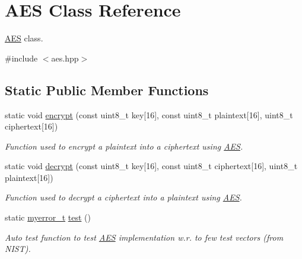 \hypertarget{classAES}{}\section{A\+E\+S Class Reference}
\label{classAES}


\hyperlink{classAES}{A\+E\+S} class.  




{\ttfamily \#include $<$aes.\+hpp$>$}

\subsection*{Static Public Member Functions}
\begin{DoxyCompactItemize}
\item 
static void \hyperlink{classAES_adb46cb1dbb14ff70f072d67913f65f38}{encrypt} (const uint8\+\_\+t key\mbox{[}16\mbox{]}, const uint8\+\_\+t plaintext\mbox{[}16\mbox{]}, uint8\+\_\+t ciphertext\mbox{[}16\mbox{]})
\begin{DoxyCompactList}\small\item\em Function used to encrypt a plaintext into a ciphertext using \hyperlink{classAES}{A\+E\+S}. \end{DoxyCompactList}\item 
static void \hyperlink{classAES_a81b2fbb6ef1422b54e4ca552a2cc36e4}{decrypt} (const uint8\+\_\+t key\mbox{[}16\mbox{]}, const uint8\+\_\+t ciphertext\mbox{[}16\mbox{]}, uint8\+\_\+t plaintext\mbox{[}16\mbox{]})
\begin{DoxyCompactList}\small\item\em Function used to decrypt a ciphertext into a plaintext using \hyperlink{classAES}{A\+E\+S}. \end{DoxyCompactList}\item 
static \hyperlink{error_8hpp_acabd2917084445509becf54ab64a4bd0}{myerror\+\_\+t} \hyperlink{classAES_a71d8490b57b8c87624b34dc5900168e5}{test} ()
\begin{DoxyCompactList}\small\item\em Auto test function to test \hyperlink{classAES}{A\+E\+S} implementation w.\+r. to few test vectors (from N\+I\+S\+T). \end{DoxyCompactList}\end{DoxyCompactItemize}

